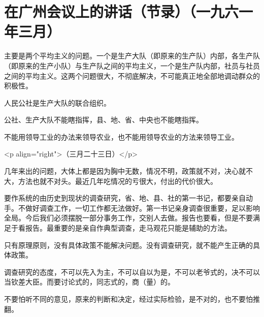 \section{在广州会议上的讲话（节录）（一九六一年三月）}


主要是两个平均主义的问题。一个是生产大队（即原来的生产队）内部，各生产队（即原来的生产小队）与生产队之间的平均主义，一个是生产队内部，社员与社员之间的平均主义。这两个问题很大，不彻底解决，不可能真正地全部地调动群众的积极性。

人民公社是生产大队的联合组织。

公社、生产大队不能瞎指挥，县、地、省、中央也不能瞎指挥。

不能用领导工业的办法来领导农业，也不能用领导农业的方法来领导工业。

<p align="right">（三月二十三日）</p>

几年来出的问题，大体上都是因为胸中无数，情况不明，政策就不对，决心就不大，方法也就不对头。最近几年吃情况的亏很大，付出的代价很大。

要作系统的由历史到现状的调查研究，省、地、县、社的第一书记，都要亲自动手。不做好调查工作，一切工作都无法做好。第一书记亲身调查很重要，足以影响全局。今后我们必须摆脱一部分事务工作，交别人去做。报告也要看，但是不要满足于看报告。最重要的是亲自作典型调查，走马观花只能是辅助的方法。

只有原理原则，没有具体政策不能解决问题。没有调查研究，就不能产生正确的具体政策。

调查研究的态度，不可以先入为主，不可以自以为是，不可以老爷式的，决不可以当钦差大臣。而要讨论式的，同志式的，商（量）的。

不要怕听不同的意见，原来的判断和决定，经过实际检验，是不对的，也不要怕推翻。


